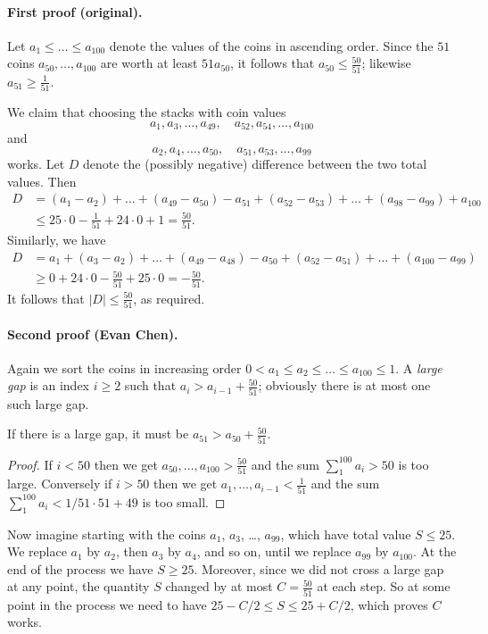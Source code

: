 \documentclass[11pt]{scrartcl}
\begin{document}
\paragraph{First proof (original).}
Let $a_1 \le \dots \le a_{100}$ denote the values of the coins in ascending order.
Since the $51$ coins $a_{50}, \dots, a_{100}$ are worth at least $51 a_{50}$,
it follows that $a_{50} \le \tfrac{50}{51}$;
likewise $a_{51} \ge \tfrac{1}{51}$.

We claim that choosing the stacks with coin values
\[a_1, a_3, \dots, a_{49}, \quad a_{52}, a_{54}, \dots, a_{100}\]
and
\[a_2, a_4, \dots, a_{50}, \quad a_{51}, a_{53}, \dots, a_{99}\]
works.
Let $D$ denote the (possibly negative) difference between the two total values.
Then
\begin{align*}
D & = (a_1-a_2) + \dots + (a_{49}-a_{50}) - a_{51} + (a_{52}-a_{53}) + \dots + (a_{98}-a_{99}) + a_{100}\\
& \le 25 \cdot 0 - \frac{1}{51} + 24 \cdot 0 + 1 = \frac{50}{51}.
\end{align*}
Similarly, we have
\begin{align*}
D & = a_1 + (a_3-a_2) + \dots + (a_{49}-a_{48}) - a_{50} + (a_{52}-a_{51}) + \dots + (a_{100}-a_{99})\\
& \ge 0 + 24 \cdot 0 - \frac{50}{51} + 25 \cdot 0 = - \frac{50}{51}.
\end{align*}
It follows that $|D| \le \tfrac{50}{51}$, as required.

\paragraph{Second proof (Evan Chen).}
Again we sort the coins in increasing order
$0 < a_1 \le a_2 \le \dots \le a_{100} \le 1$.
A \emph{large gap} is an index $i \ge 2$
such that $a_i > a_{i-1} + \frac{50}{51}$;
obviously there is at most one such large gap.

\begin{claim*}
If there is a large gap,
it must be $a_{51} > a_{50} + \frac{50}{51}$.
\end{claim*}
\begin{proof}
If $i < 50$ then we get $a_{50}, \dots, a_{100} > \frac{50}{51}$
and the sum $\sum_1^{100} a_i > 50$ is too large.
Conversely if $i > 50$ then we get
$a_1, \dots, a_{i-1} < \frac{1}{51}$
and the sum $\sum_1^{100} a_i < 1/51 \cdot 51 + 49$ is too small.
\end{proof}

Now imagine starting with the coins $a_1$, $a_3$, \dots, $a_{99}$,
which have total value $S \le 25$.
We replace $a_1$ by $a_2$,
then $a_3$ by $a_4$, and so on,
until we replace $a_{99}$ by $a_{100}$.
At the end of the process we have $S \ge 25$.
Moreover, since we did not cross a large gap at any point,
the quantity $S$ changed by at most $C = \frac{50}{51}$ at each step.
So at some point in the process we need to have $25-C/2 \le S \le 25+C/2$,
which proves $C$ works.
\pagebreak
\end{document}
